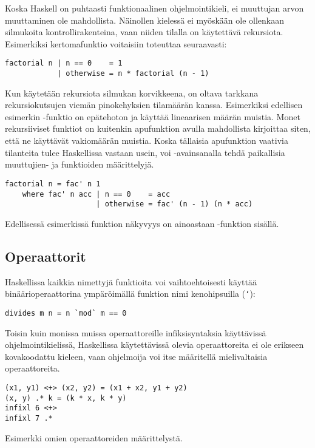 Koska Haskell on puhtaasti funktionaalinen ohjelmointikieli,
ei muuttujan arvon muuttaminen ole mahdollista.
Näinollen kielessä ei myöskään ole ollenkaan silmukoita kontrollirakenteina,
vaan niiden tilalla on käytettävä rekursiota.
Esimerkiksi kertomafunktio voitaisiin toteuttaa seuraavasti:

\begin{verbatim}
factorial n | n == 0    = 1
            | otherwise = n * factorial (n - 1)
\end{verbatim}

Kun käytetään rekursiota silmukan korvikkeena,
on oltava tarkkana rekursiokutsujen viemän pinokehyksien tilamäärän kanssa.
Esimerkiksi edellisen esimerkin -funktio on epätehoton ja käyttää lineaarisen määrän muistia.
Monet rekursiiviset funktiot on kuitenkin apufunktion avulla mahdollista kirjoittaa siten,
että ne käyttävät vakiomäärän muistia.
Koska tällaisia apufunktion vaativia tilanteita tulee Haskellissa vastaan usein,
voi -avainsanalla tehdä paikallisia muuttujien- ja funktioiden määrittelyjä.

\begin{verbatim}
factorial n = fac' n 1
    where fac' n acc | n == 0    = acc
                     | otherwise = fac' (n - 1) (n * acc)
\end{verbatim}

Edellisessä esimerkissä funktion  näkyvyys on ainoastaan -funktion sisällä.

\subsection{Operaattorit}
Haskellissa kaikkia nimettyjä funktioita voi vaihtoehtoisesti käyttää binäärioperaattorina ympäröimällä funktion nimi kenohipsuilla (\texttt{`}):
\begin{verbatim}
divides m n = n `mod` m == 0
\end{verbatim}

Toisin kuin monissa muissa operaattoreille infiksisyntaksia käyttävissä ohjelmointikielissä,
Haskellissa käytettävissä olevia operaattoreita ei ole erikseen kovakoodattu kieleen,
vaan ohjelmoija voi itse määritellä mielivaltaisia operaattoreita.

\begin{listing}[H]
\begin{verbatim}
(x1, y1) <+> (x2, y2) = (x1 + x2, y1 + y2)
(x, y) .* k = (k * x, k * y)
infixl 6 <+>
infixl 7 .*
\end{verbatim}
\label{lst:operators-example}
\caption{Esimerkki omien operaattoreiden määrittelystä.}
\end{listing}

